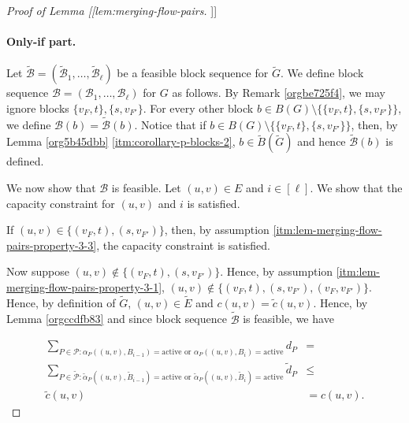 \documentclass[fontsize=11pt,paper=a4]{book}
\begin{document}
\begin{proof}[Proof of Lemma [[lem:merging-flow-pairs]]]
\paragraph{Only-if part.}
Let \(\tilde{\mathcal{B}}=(\tilde{\mathscr{B}}_1,\dots,\tilde{\mathscr{B}}_{\ell})\) be a feasible block sequence for \(\tilde{G}\).
We define block sequence \(\mathcal{B}=(\mathscr{B}_1,\dots,\mathscr{B}_{\ell})\) for \(G\) as follows.
By Remark \ref{orgbe725f4}, we may ignore blocks \(\{v_F,t\},\{s,v_{F'}\}\).
For every other block \(b\in B(G)\setminus\{\{v_F,t\},\{s,v_{F'}\}\}\), we define \(\mathcal{B}(b)=\tilde{\mathcal{B}}(b)\).
Notice that if \(b\in B(G)\setminus\{\{v_F,t\},\{s,v_{F'}\}\}\), then, by Lemma \ref{org5b45dbb} \ref{itm:corollary-p-blocks-2}, \(b\in\tilde{B}(\tilde{G})\) and hence \(\tilde{\mathcal{B}}(b)\) is defined.

We now show that \(\mathcal{B}\) is feasible.
Let \((u,v)\in E\) and \(i\in[\ell]\).
We show that the capacity constraint for \((u,v)\) and \(i\) is satisfied.

If \((u,v)\in\{(v_F,t),(s,v_{F'})\}\), then, by assumption \ref{itm:lem-merging-flow-pairs-property-3-3}, the capacity constraint is satisfied.

Now suppose \((u,v)\notin\{(v_F,t),(s,v_{F'})\}\).
Hence, by assumption \ref{itm:lem-merging-flow-pairs-property-3-1}, \((u,v)\notin\{(v_F,t),(s,v_{F'}),(v_F,v_{F'})\}\).
Hence, by definition of \(\tilde{G}\), \((u,v)\in\tilde{E}\) and \(c(u,v)=\tilde{c}(u,v)\).
Hence, by Lemma \ref{orgccdfb83} and since block sequence \(\tilde{\mathcal{B}}\) is feasible, we have

\begin{align*}
\sum_{P\in\mathcal{P}:\alpha_P((u,v),B_{i-1})=\mathrm{active}\text{ or }\alpha_P((u,v),B_i)=\mathrm{active}}d_P&=\\
\sum_{P\in\tilde{\mathcal{P}}:\tilde{\alpha}_P((u,v),\tilde{B}_{i-1})=\mathrm{active}\text{ or }\tilde{\alpha}_P((u,v),\tilde{B}_i)=\mathrm{active}}\tilde{d}_P&\leq\\
\tilde{c}(u,v)&=
c(u,v).
\end{align*}
\end{proof}
\end{document}
